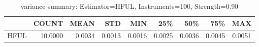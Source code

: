 \begin{table}[ht]
\centering
\caption{variance summary: Estimator=HFUL, Instruments=100, Strength=0.90}
\begin{tabular}{lrrrrrrrr}
\toprule
 & COUNT & MEAN & STD & MIN & 25\% & 50\% & 75\% & MAX \\
\midrule
HFUL & 10.0000 & 0.0034 & 0.0013 & 0.0016 & 0.0025 & 0.0036 & 0.0045 & 0.0051 \\
\bottomrule
\end{tabular}
\end{table}
